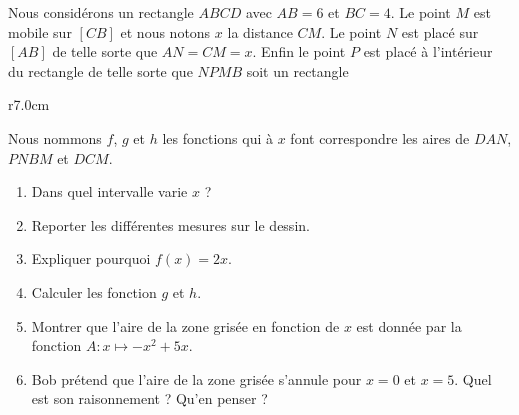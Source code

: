 
\begin{exercice}[\ldots/6]\label{exosmath-0633}

    Nous considérons un rectangle \( ABCD\) avec \( AB=6\) et \( BC=4\). Le point \( M\) est mobile sur \( [CB]\) et nous notons \( x\) la distance \( CM\). Le point \( N\) est placé sur \( [AB]\) de telle sorte que \( AN=CM=x\). Enfin le point \( P\) est placé à l'intérieur du rectangle de telle sorte que \( NPMB\) soit un rectangle

\begin{wrapfigure}{r}{7.0cm}
   \vspace{-0.5cm}        %
   \centering
   
\end{wrapfigure}

    Nous nommons \( f\), \( g\) et \( h\) les fonctions qui à \( x\) font correspondre les aires de \( DAN\), \( PNBM\) et \( DCM\).

    \begin{enumerate}
        \item
            Dans quel intervalle varie \( x\) ?
        \item
            Reporter les différentes mesures sur le dessin.
        \item
            Expliquer pourquoi \( f(x)=2x\).
        \item   %
            Calculer les fonction \( g\) et \( h\).
        \item   %
            Montrer que l'aire de la zone grisée en fonction de \( x\) est donnée par la fonction \( A\colon x\mapsto -x^2+5x\).
        \item   %
            Bob prétend que l'aire de la zone grisée s'annule pour \( x=0\) et \( x=5\). Quel est son raisonnement ? Qu'en penser ?
    \end{enumerate}

\end{exercice}
